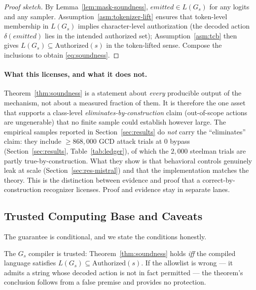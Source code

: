 \begin{proof}[Proof sketch]
By Lemma~\ref{lem:mask-soundness}, \(\textit{emitted} \in L(G_s)\) for any logits and any sampler. Assumption~\ref{asm:tokenizer-lift} ensures that token-level membership in \(L(G_s)\) implies character-level authorization (the decoded action \(\delta(\textit{emitted})\) lies in the intended authorized set); Assumption~\ref{asm:tcb} then gives \(L(G_s) \subseteq \mathrm{Authorized}(s)\) in the token-lifted sense. Compose the inclusions to obtain \eqref{eq:soundness}.
\end{proof}

\paragraph{What this licenses, and what it does not.} Theorem~\ref{thm:soundness} is a statement about \emph{every} producible output of the mechanism, not about a measured fraction of them. It is therefore the one asset that supports a class-level \emph{eliminates-by-construction} claim (out-of-scope actions are ungenerable) that no finite sample could establish however large. The empirical samples reported in Section~\ref{sec:results} do \emph{not} carry the ``eliminates'' claim: they include \(\ge\!868{,}000\) GCD attack trials at \(0\) bypass (Section~\ref{sec:results}, Table~\ref{tab:ledger}), of which the \(2{,}000\) steelman trials are partly true-by-construction. What they show is that behavioral controls genuinely leak at scale (Section~\ref{sec:res-mistral}) and that the implementation matches the theory. This is the distinction between evidence and proof that a correct-by-construction recognizer \cite{sassaman2013langsec} licenses. Proof and evidence stay in separate lanes.

\subsection{Trusted Computing Base and Caveats}
\label{sub:formal-tcb}

The guarantee is conditional, and we state the conditions honestly.

\begin{assumption}
\label{asm:tcb}
The \(G_s\) compiler is trusted: Theorem~\ref{thm:soundness} holds \emph{iff} the compiled language satisfies \(L(G_s) \subseteq \mathrm{Authorized}(s)\). If the allowlist is wrong --- it admits a string whose decoded action is not in fact permitted --- the theorem's conclusion follows from a false premise and provides no protection.
\end{assumption}

